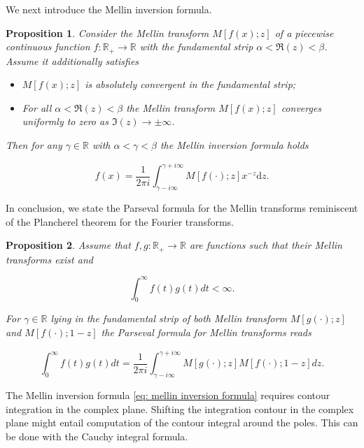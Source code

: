 \documentclass[12pt,twoside]{article}
\theoremstyle{plain}
\theoremstyle{plain}
\newtheorem{proposition}{Proposition}[section]
\theoremstyle{definition}
\theoremstyle{remark}
\numberwithin{equation}{section}
\begin{document}
We next introduce the Mellin inversion formula.

\begin{proposition}

Consider the Mellin transform $M[f(x); z]$ of a piecewise continuous function $f: \mathbb{R}_{+} \rightarrow \mathbb{R}$ with the fundamental strip $\alpha<\Re (z)<\beta$. Assume it additionally satisfies

\begin{itemize}
    \item $M[f(x); z]$ is absolutely convergent in the fundamental strip;
    \item For all $\alpha<\Re (z)<\beta$ the Mellin transform $M[f(x); z]$ converges uniformly to zero as $\Im(z)\rightarrow \pm \infty$.
\end{itemize}

Then for any $\gamma \in\mathbb R$ with $\alpha < \gamma < \beta$ the \emph{Mellin inversion formula} holds

\begin{equation}
\label{eq: mellin inversion formula}
f(x)=\frac{1}{2 \pi i} \int_{\gamma-i \infty}^{\gamma+i \infty} M[f(\cdot); z] x^{-z} \mathrm{d} z.
\end{equation}

\end{proposition}

In conclusion, we state the Parseval formula for the Mellin transforms reminiscent of the Plancherel theorem for the Fourier transforms.

\begin{proposition}

Assume that $f, g:\mathbb R_+\rightarrow \mathbb R$ are functions such that their Mellin transforms exist and 

$$\int_{0}^{\infty} f(t) g(t) d t < \infty.$$

For $\gamma\in \mathbb R$ lying in the fundamental strip of both Mellin transform $M[g(\cdot);z]$ and $M[f(\cdot); 1-z]$ the \emph{Parseval formula} for Mellin transforms reads

\begin{equation}
\label{eq: parseval formula}
\int_{0}^{\infty} f(t) g(t) d t=\frac{1}{2 \pi i} \int_{\gamma-i \infty}^{\gamma+i \infty} M[g (\cdot); z] M[f (\cdot); 1-z] d z.
\end{equation}

\end{proposition}

The Mellin inversion formula \eqref{eq: mellin inversion formula} requires contour integration in the complex plane. Shifting the integration contour in the complex plane might entail computation of the contour integral around the poles. This can be done with the Cauchy integral formula.
\end{document}
